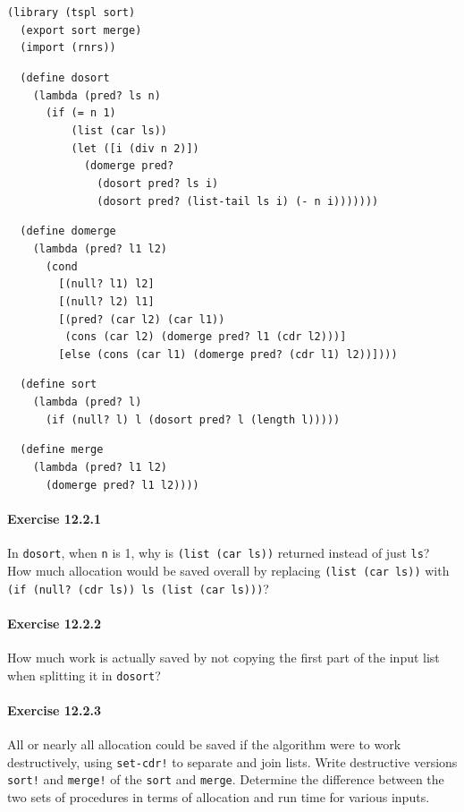 \begin{alltt}
(library (tspl sort)
  (export sort merge)
  (import (rnrs))

  (define dosort
    (lambda (pred? ls n)
      (if (= n 1)
          (list (car ls))
          (let ([i (div n 2)])
            (domerge pred?
              (dosort pred? ls i)
              (dosort pred? (list-tail ls i) (- n i)))))))

  (define domerge
    (lambda (pred? l1 l2)
      (cond
        [(null? l1) l2]
        [(null? l2) l1]
        [(pred? (car l2) (car l1))
         (cons (car l2) (domerge pred? l1 (cdr l2)))]
        [else (cons (car l1) (domerge pred? (cdr l1) l2))])))

  (define sort
    (lambda (pred? l)
      (if (null? l) l (dosort pred? l (length l)))))

  (define merge
    (lambda (pred? l1 l2)
      (domerge pred? l1 l2))))
\end{alltt}

\paragraph{Exercise \label{examples_g159}12.2.1}


\label{examples_s12}In \texttt{dosort}, when \texttt{n} is 1, why is
\texttt{(list (car ls))} returned instead of just \texttt{ls}?
How much allocation would be saved overall by replacing
\texttt{(list (car ls))} with
\texttt{(if (null? (cdr ls)) ls (list (car ls)))}?


\paragraph{Exercise \label{examples_g160}12.2.2}


\label{examples_s13}How much
work is actually saved by not copying the first part of the input
list when splitting it in \texttt{dosort}?


\paragraph{Exercise \label{examples_g161}12.2.3}


\label{examples_s14}All or nearly all allocation could be saved if the algorithm were to work
destructively, using \texttt{set-cdr!} to separate and join lists.
Write destructive versions \texttt{sort!} and \texttt{merge!} of the \texttt{sort} and
\texttt{merge}.
Determine the difference between the two sets of procedures in
terms of allocation and run time for various inputs.



